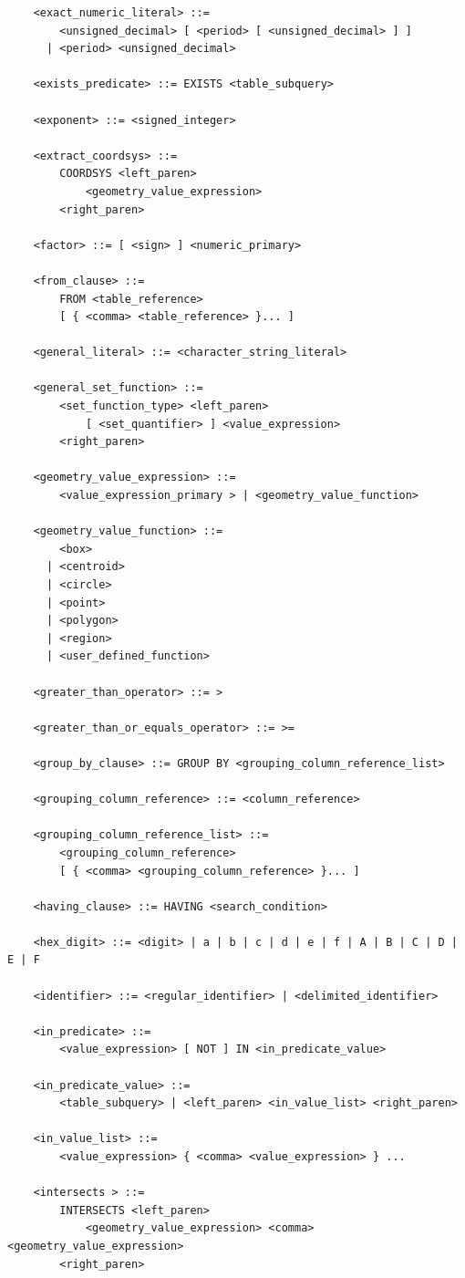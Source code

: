\documentclass[11pt,a4paper]{ivoa}
\begin{document}
\begin{verbatim}
    <exact_numeric_literal> ::=
        <unsigned_decimal> [ <period> [ <unsigned_decimal> ] ]
      | <period> <unsigned_decimal>

    <exists_predicate> ::= EXISTS <table_subquery>

    <exponent> ::= <signed_integer>

    <extract_coordsys> ::=
        COORDSYS <left_paren>
            <geometry_value_expression>
        <right_paren>

    <factor> ::= [ <sign> ] <numeric_primary>

    <from_clause> ::=
        FROM <table_reference>
	    [ { <comma> <table_reference> }... ]

    <general_literal> ::= <character_string_literal>

    <general_set_function> ::=
        <set_function_type> <left_paren>
            [ <set_quantifier> ] <value_expression>
        <right_paren>

    <geometry_value_expression> ::=
        <value_expression_primary > | <geometry_value_function>

    <geometry_value_function> ::=
        <box>
      | <centroid>
      | <circle>
      | <point>
      | <polygon>
      | <region>
      | <user_defined_function>

    <greater_than_operator> ::= >

    <greater_than_or_equals_operator> ::= >=

    <group_by_clause> ::= GROUP BY <grouping_column_reference_list>

    <grouping_column_reference> ::= <column_reference>

    <grouping_column_reference_list> ::=
        <grouping_column_reference>
        [ { <comma> <grouping_column_reference> }... ]

    <having_clause> ::= HAVING <search_condition>

    <hex_digit> ::= <digit> | a | b | c | d | e | f | A | B | C | D | E | F

    <identifier> ::= <regular_identifier> | <delimited_identifier>

    <in_predicate> ::=
        <value_expression> [ NOT ] IN <in_predicate_value>

    <in_predicate_value> ::=
        <table_subquery> | <left_paren> <in_value_list> <right_paren>

    <in_value_list> ::=
        <value_expression> { <comma> <value_expression> } ...

    <intersects > ::=
        INTERSECTS <left_paren>
            <geometry_value_expression> <comma> <geometry_value_expression>
        <right_paren>


\end{verbatim}
\end{document}
